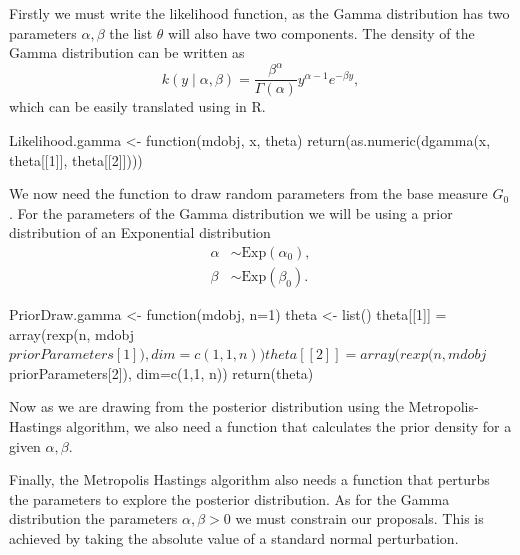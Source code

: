 \documentclass[nojss]{jss}
\begin{document}
Firstly we must write the likelihood function, as the Gamma distribution has two parameters $\alpha, \beta$ the list $\theta$ will also have two components. The density of the Gamma distribution can be written as
\begin{equation*}
k(y \mid \alpha, \beta) = \frac{\beta ^ \alpha}{\Gamma (\alpha)} y^{\alpha -1} e ^{- \beta y},
\end{equation*}
which can be easily translated using  in R.
\begin{CodeInput}
Likelihood.gamma <- function(mdobj, x, theta){
  return(as.numeric(dgamma(x, theta[[1]], theta[[2]])))
}
\end{CodeInput}

We now need the function to draw random parameters from the base measure $G_0$. For the parameters of the Gamma distribution we will be using a prior distribution of an Exponential distribution
\begin{align*}
\alpha & \sim \text{Exp} (\alpha _0), \\
\beta & \sim \text{Exp} (\beta _0).
\end{align*}

\begin{CodeInput}
PriorDraw.gamma <- function(mdobj, n=1){
  theta <- list()
  theta[[1]] = array(rexp(n, mdobj$priorParameters[1]), dim=c(1,1, n))
  theta[[2]] = array(rexp(n, mdobj$priorParameters[2]), dim=c(1,1, n))
  return(theta)
}
\end{CodeInput}

Now as we are drawing from the posterior distribution using the Metropolis-Hastings algorithm, we also need a function that calculates the prior density for a given ${\alpha, \beta}$.

Finally, the Metropolis Hastings algorithm also needs a function that perturbs the parameters to explore the posterior distribution. As for the Gamma distribution the parameters $\alpha, \beta >0$ we must constrain our proposals. This is achieved by taking the absolute value of a standard normal perturbation.
\end{document}
